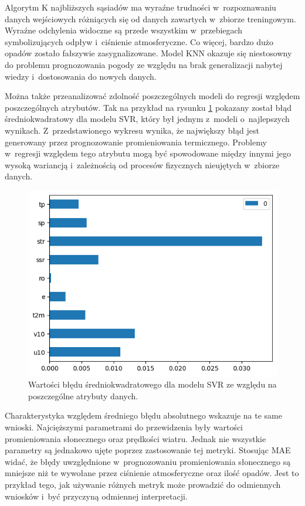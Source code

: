 Algorytm K najbliższych sąsiadów ma wyraźne trudności w~rozpoznawaniu danych wejściowych różniących się od 
danych zawartych w~zbiorze treningowym. Wyraźne odchylenia widoczne są przede wszystkim w~przebiegach  
symbolizujących odpływ i~ciśnienie atmosferyczne. Co więcej, bardzo dużo opadów zostało fałszywie
zasygnalizowane. Model KNN okazuje się niestosowny do problemu prognozowania pogody ze względu
na brak generalizacji nabytej wiedzy i~dostosowania do nowych danych.

\pagebreak

Można także przeanalizować zdolność poszczególnych modeli do regresji względem poszczególnych atrybutów.
Tak na przykład na rysunku \ref{svr-mse-bar} pokazany został błąd średniokwadratowy dla modelu SVR, który był
jednym z~modeli o~najlepszych wynikach. Z~przedstawionego wykresu wynika, że największy błąd jest generowany
przez prognozowanie promieniowania termicznego. Problemy w~regresji względem tego atrybutu mogą być  
spowodowane między innymi jego wysoką wariancją i~zależnością od procesów fizycznych nieujętych w~zbiorze 
danych.

\begin{figure}[H]
    \centering
    \includegraphics[width=\textwidth]{images/svr_mse_bar.png}
    \caption[Błąd średniokwadratowy dla SVR]{Wartości błędu średniokwadratowego dla modelu SVR ze względu na poszczególne atrybuty danych.}
    \label{svr-mse-bar}
\end{figure}

Charakterystyka względem średniego błędu absolutnego wskazuje na te same wnioski. Najcięższymi parametrami
do przewidzenia były wartości promieniowania słonecznego oraz prędkości wiatru. Jednak nie wszystkie
parametry są jednakowo ujęte poprzez zastosowanie tej metryki. Stosując MAE widać, że błędy 
uwzględnione w~prognozowaniu promieniowania słonecznego są mniejsze niż te wywołane przez ciśnienie
atmosferyczne oraz ilość opadów. Jest to przykład tego, jak używanie różnych metryk może prowadzić do 
odmiennych wniosków i~być przyczyną odmiennej interpretacji.

